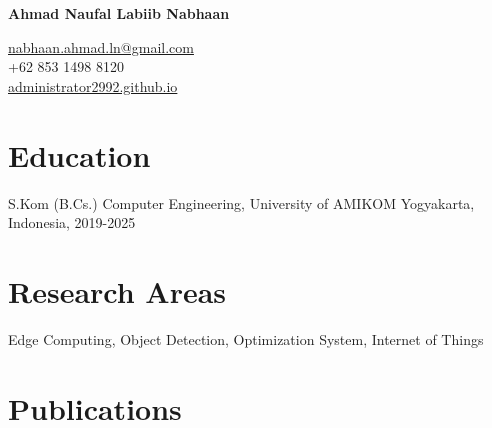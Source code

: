 \documentclass[12pt,letterpaper]{report}
\newcommand{\myname}{Ahmad Naufal Labiib Nabhaan}
\newcommand{\namefont}[1]{{\normalfont\bfseries\Huge{#1}}}
\newcommand{\listitemspace}{0.25em}
\renewenvironment{itemize}
{\begin{list}{}{\setlength{\leftmargin}{0em}
                \setlength{\parskip}{0em}
                \setlength{\itemsep}{\listitemspace}
                \setlength{\parsep}{\listitemspace}}}
{\end{list}}
\begin{document}
    \raggedright{}

    \namefont{\myname}

    \vspace{1em}
    \begin{minipage}[t]{0.295\textwidth}
        \flushright{}
        \href{mailto:nabhaan.ahmad.ln@gmail.com}{nabhaan.ahmad.ln@gmail.com} \\
        +62 853 1498 8120 \\
        \href{https://administrator2992.github.io}{administrator2992.github.io}
    \end{minipage}

    \section*{Education}

    \begin{tablist}
        \item[S.Kom (B.Cs.)] \tab{}Computer Engineering, University of AMIKOM Yogyakarta, Indonesia, 2019-2025 \\
    \end{tablist}
    
    \section*{Research Areas}
    \begin{itemize}
        \item Edge Computing, Object Detection, Optimization System, Internet of Things
    \end{itemize}
    
    \section*{Publications}
\end{document}

